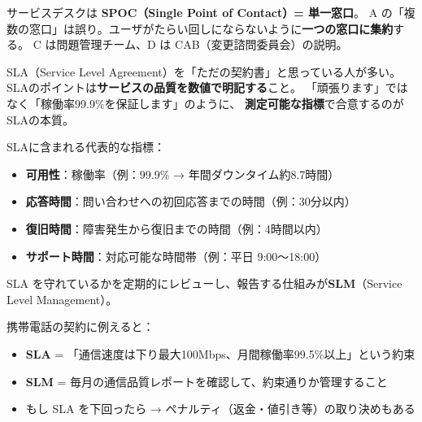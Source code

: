 \begin{trickwarn}
サービスデスクは \textbf{SPOC（Single Point of Contact）= 単一窓口}。
A の「複数の窓口」は誤り。ユーザがたらい回しにならないように\textbf{一つの窓口に集約}する。
C は問題管理チーム、D は CAB（変更諮問委員会）の説明。
\end{trickwarn}




\mondaipage
{}

\begin{stumble}
SLA（Service Level Agreement）を「ただの契約書」と思っている人が多い。
SLAのポイントは\textbf{サービスの品質を数値で明記する}こと。
「頑張ります」ではなく「稼働率99.9\%を保証します」のように、
\textbf{測定可能な指標}で合意するのがSLAの本質。
\end{stumble}

\begin{keypoint}
SLAに含まれる代表的な指標：
\begin{itemize}
  \item \textbf{可用性}：稼働率（例：99.9\% → 年間ダウンタイム約8.7時間）
  \item \textbf{応答時間}：問い合わせへの初回応答までの時間（例：30分以内）
  \item \textbf{復旧時間}：障害発生から復旧までの時間（例：4時間以内）
  \item \textbf{サポート時間}：対応可能な時間帯（例：平日 9:00〜18:00）
\end{itemize}
SLA を守れているかを定期的にレビューし、報告する仕組みが\textbf{SLM}（Service Level Management）。
\end{keypoint}

\begin{analogy}
携帯電話の契約に例えると：
\begin{itemize}
  \item \textbf{SLA} = 「通信速度は下り最大100Mbps、月間稼働率99.5\%以上」という約束
  \item \textbf{SLM} = 毎月の通信品質レポートを確認して、約束通りか管理すること
  \item もし SLA を下回ったら → ペナルティ（返金・値引き等）の取り決めもある
\end{itemize}
\end{analogy}

